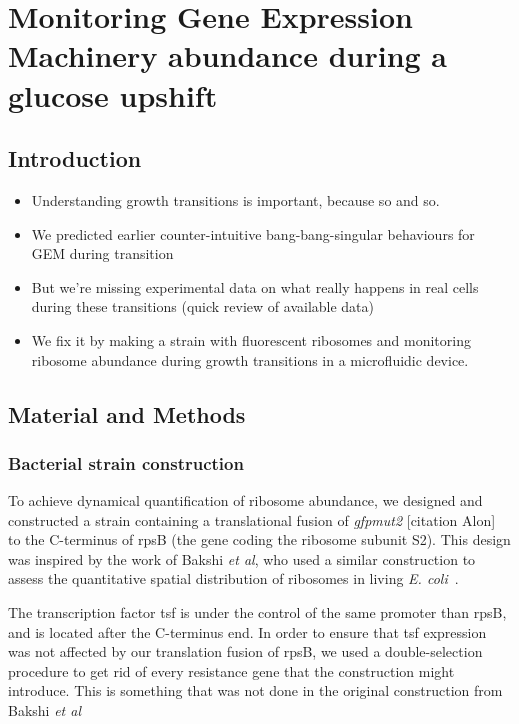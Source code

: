 \chapter{Monitoring Gene Expression Machinery abundance during a glucose upshift}

\section{Introduction}

\begin{itemize}
\item Understanding growth transitions is important, because so and so.
\item We predicted earlier counter-intuitive bang-bang-singular behaviours for GEM during transition
\item But we're missing experimental data on what really happens in real cells during these transitions (quick review of available data)
\item We fix it by making a strain with fluorescent ribosomes and monitoring ribosome abundance during growth transitions in a microfluidic device.
\end{itemize}

\section{Material and Methods}

\subsection*{Bacterial strain construction}

To achieve dynamical quantification of ribosome abundance, we designed and constructed a strain containing a translational fusion of \textit{gfpmut2} [citation Alon] to the C-terminus of rpsB (the gene coding the ribosome subunit S2).
This design was inspired by the work of Bakshi \textit{et al}, who used a similar construction to assess the quantitative spatial distribution of ribosomes in living \textit{E. coli}~\cite{bakshi_superresolution_2012}.

The transcription factor tsf is under the control of the same promoter than rpsB, and is located after the C-terminus end.
In order to ensure that tsf expression was not affected by our translation fusion of rpsB, we used a double-selection procedure to get rid of every resistance gene that the construction might introduce.
This is something that was not done in the original construction from Bakshi \textit{et al}~\cite{bakshi_superresolution_2012}

